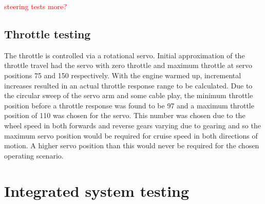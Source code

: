 \documentclass[main.tex]{subfiles}
\begin{document}
\textcolor{red}{steering tests more?}

\subsection{Throttle testing}
The throttle is controlled via a rotational servo. Initial approximation of the throttle travel had the servo with zero throttle and maximum throttle at servo positions 75 and 150 respectively. With the engine warmed up, incremental increases resulted in an actual throttle response range to be calculated. Due to the circular sweep of the servo arm and some cable play, the minimum throttle position before a throttle response was found to be 97 and a maximum throttle position of 110 was chosen for the servo. This number was chosen due to the wheel speed in both forwards and reverse gears varying due to gearing and so the maximum servo position would be required for cruise speed in both directions of motion. A higher servo position than this would never be required for the chosen operating scenario.

\section{Integrated system testing}
\end{document}
